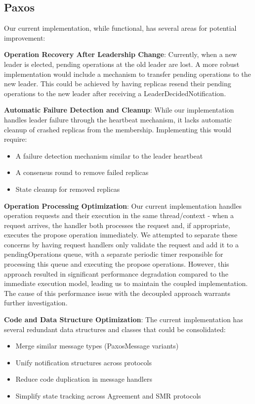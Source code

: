 \documentclass[10pt,a4paper,twocolumn]{article}
\begin{document}
\subsection{Paxos}
\label{sec:paxoslimitfuture}
Our current implementation, while functional, has several areas for potential improvement:
\par \textbf{Operation Recovery After Leadership Change}: Currently, when a new leader is elected, pending operations at the old leader are lost. A more robust implementation would include a mechanism to transfer pending operations to the new leader. This could be achieved by having replicas resend their pending operations to the new leader after receiving a LeaderDecidedNotification.
\par \textbf{Automatic Failure Detection and Cleanup}: While our implementation handles leader failure through the heartbeat mechanism, it lacks automatic cleanup of crashed replicas from the membership. Implementing this would require:
\begin{itemize}
  	\setlength\itemsep{0em}
	\item A failure detection mechanism similar to the leader heartbeat
	\item A consensus round to remove failed replicas
	\item State cleanup for removed replicas
\end{itemize}
\par \textbf{Operation Processing Optimization}: Our current implementation handles operation requests and their execution in the same thread/context - when a request arrives, the handler both processes the request and, if appropriate, executes the propose operation immediately. We attempted to separate these concerns by having request handlers only validate the request and add it to a pendingOperations queue, with a separate periodic timer responsible for processing this queue and executing the propose operations. However, this approach resulted in significant performance degradation compared to the immediate execution model, leading us to maintain the coupled implementation. The cause of this performance issue with the decoupled approach warrants further investigation.
\par \textbf{Code and Data Structure Optimization}: The current implementation has several redundant data structures and classes that could be consolidated:
\begin{itemize}
  	\setlength\itemsep{0em}
	\item Merge similar message types (PaxosMessage variants)
	\item Unify notification structures across protocols
	\item Reduce code duplication in message handlers
	\item Simplify state tracking across Agreement and SMR protocols
\end{itemize}
\end{document}
